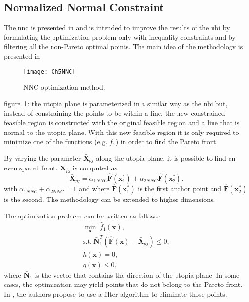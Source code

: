 \subsection{Normalized Normal Constraint}
\label{sec:NNC}
The \gls{nnc} is presented in \citet{Messac2003} and is intended to improve the results of the \gls{nbi} by formulating the optimization problem only with inequality constraints and by filtering all the non-Pareto optimal points. The main idea of the methodology is presented in
%
\begin{figure}[b]%
	\centering
	\texttt{[image: Ch5NNC]}%
	\caption{NNC optimization method.}%
	\label{fig:NNC}%
\end{figure}
%
figure~\ref{fig:NNC}: the utopia plane is parameterized in a similar way as the \gls{nbi} but, instead of constraining the points to be within a line, the new constrained feasible region is constructed with the original feasible region and a line that is normal to the utopia plane. With this new feasible region it is only required to minimize one of the functions (e.g. $f_{1}$) in order to find the Pareto front.

By varying the parameter $\bar{\mathbf{X}}_{pj}$ along the utopia plane, it is possible to find an even spaced front. $\bar{\mathbf{X}}_{pj}$ is computed as%
%
\begin{equation}
\bar{\mathbf{X}}_{pj}= \alpha_{1NNC} \mathbf{\hat{F}}(\mathbf{x}_1^*)+\alpha_{2NNC} \mathbf{\hat{F}}(\mathbf{x}_2^*).
\label{eq:Xpj}
\end{equation}%
%
with $\alpha_{1NNC}+\alpha_{2NNC}=1$ and where $\mathbf{\hat{F}}(\mathbf{x}_1^*)$ is the first anchor point and $\mathbf{\hat{F}}(\mathbf{x}_2^*)$ is the second. The methodology can be extended to higher dimensions.

The optimization problem can be written as follows:
%
\begin{equation}
\begin{gathered}
\min_{\mathbf{x}}{\; \hat{f}_{1}(\mathbf{x})}, \\
\text{s.t.} \ \bar{\mathbf{N}}_1^T \left(\hat{\mathbf{F}}(\mathbf{x})-\bar{\mathbf{X}}_{pj}\right) \leq 0,\\
h(\mathbf{x})=0, \\
g(\mathbf{x}) \leq 0,
\end{gathered}
\label{eq:NNCProblem}
\end{equation}
%
where $\bar{\mathbf{N}}_1$ is the vector that contains the direction of the utopia plane. In some cases, the optimization may yield points that do not belong to the Pareto front. In \citet{Messac2003}, the authors propose to use a filter algorithm to eliminate those points.

